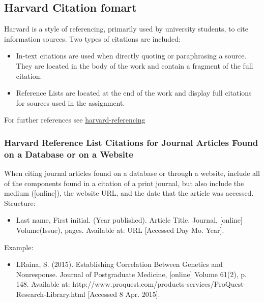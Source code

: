 \subsection{Harvard Citation fomart}

Harvard is a style of referencing, primarily used by university students, to cite information sources.
Two types of citations are included:\\

\begin{itemize}
	\item In-text citations are used when directly quoting or paraphrasing a source. They are located in the body of the work and contain a fragment of the full citation. 
	\item Reference Lists are located at the end of the work and display full citations for sources used in the assignment.
\end{itemize}
For further references see \href{http://www.citethisforme.com/harvard-referencing}{harvard-referencing}

\subsubsection{Harvard Reference List Citations for Journal Articles Found on a Database or on a Website}

When citing journal articles found on a database or through a website, include all of the components found in a citation of a print journal, but also include the medium ([online]), the website URL, and the date that the article was accessed.\\
Structure:\\
\begin{itemize}
	\item Last name, First initial. (Year published). Article Title. Journal, [online] Volume(Issue), pages. Available at: URL [Accessed Day Mo. Year].
\end{itemize}
Example:\\
\begin{itemize}
	\item LRaina, S. (2015). Establishing Correlation Between Genetics and Nonresponse. Journal of Postgraduate Medicine, [online] Volume 61(2), p. 148. Available at: http://www.proquest.com/products-services/ProQuest-Research-Library.html [Accessed 8 Apr. 2015].
\end{itemize}

